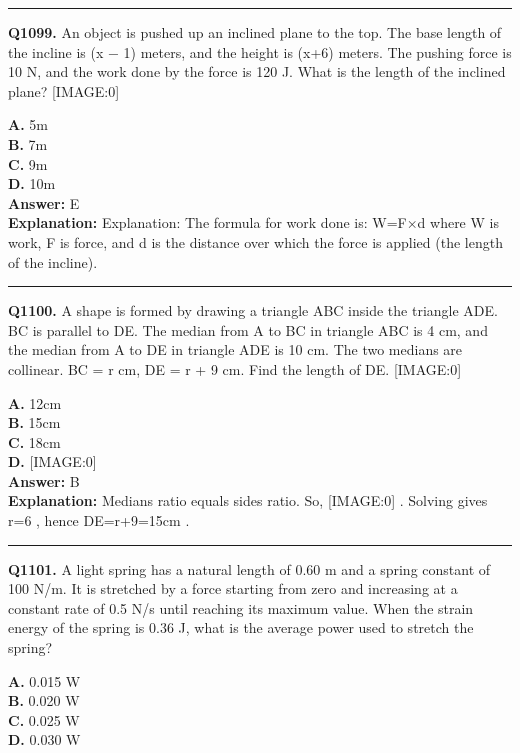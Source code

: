 \documentclass[12pt]{article}
\begin{document}
\hrule
\vspace{1em}


\noindent
\textbf{Q1099.} An object is pushed up an inclined plane to the top. The base length of the incline is (x
−
1) meters, and the height is (x+6) meters. The pushing force is 10 N, and the work done by the force is 120 J. What is the length of the inclined plane?
[IMAGE:0]



\textbf{A.} 5m \\
\textbf{B.} 7m \\
\textbf{C.} 9m \\
\textbf{D.} 10m \\

\textbf{Answer:} E \\
\textbf{Explanation:} Explanation:
The formula for work done is:
W=F×d
where W is work, F is force, and d is the distance over which the force is applied (the length of the incline).

\hrule
\vspace{1em}


\noindent
\textbf{Q1100.} A shape is formed by drawing a triangle ABC inside the triangle ADE. BC is parallel to DE. The median from A to BC in triangle ABC is 4 cm, and the median from A to DE in triangle ADE is 10 cm. The two medians are collinear. BC = r cm, DE = r + 9 cm.
Find the length of DE.
[IMAGE:0]



\textbf{A.} 12cm \\
\textbf{B.} 15cm \\
\textbf{C.} 18cm \\
\textbf{D.} [IMAGE:0] \\

\textbf{Answer:} B \\
\textbf{Explanation:} Medians ratio equals sides ratio. So,
[IMAGE:0]
. Solving gives r=6
, hence DE=r+9=15cm
.

\hrule
\vspace{1em}


\noindent
\textbf{Q1101.} A light spring has a natural length of 0.60 m and a spring constant of 100 N/m. It is stretched by a force starting from zero and increasing at a constant rate of 0.5 N/s until reaching its maximum value. When the strain energy of the spring is 0.36 J, what is the average power used to stretch the spring?



\textbf{A.} 0.015 W \\
\textbf{B.} 0.020 W \\
\textbf{C.} 0.025 W \\
\textbf{D.} 0.030 W \\
\end{document}
